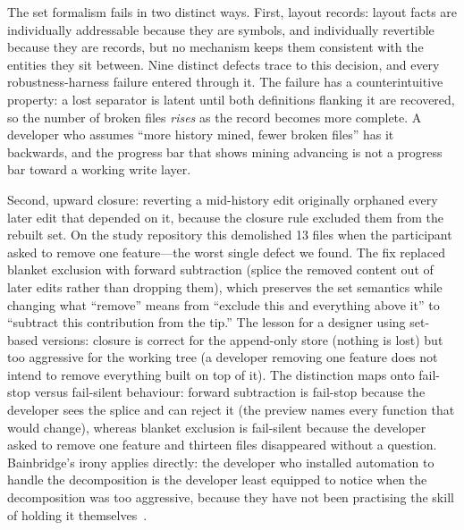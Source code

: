 The set formalism fails in two distinct ways. First, layout records: layout
facts are individually addressable because they are symbols, and individually
revertible because they are records, but no mechanism keeps them consistent with
the entities they sit between. Nine distinct defects trace to this decision, and
every robustness-harness failure entered through it. The failure has a
counterintuitive property: a lost separator is latent until both definitions
flanking it are recovered, so the number of broken files \emph{rises} as the
record becomes more complete. A developer who assumes ``more history mined,
fewer broken files'' has it backwards, and the progress bar that shows mining
advancing is not a progress bar toward a working write layer.

Second, upward closure: reverting a mid-history edit originally orphaned every
later edit that depended on
it, because the closure rule excluded them from the rebuilt set. On the study
repository this demolished 13 files when the participant asked to remove one
feature---the worst single defect we found. The fix replaced blanket exclusion
with forward subtraction (splice the removed content out of later edits rather
than dropping them), which preserves the set semantics while changing what
``remove'' means from ``exclude this and everything above it'' to ``subtract this
contribution from the tip.'' The lesson for a designer using set-based versions:
closure is correct for the append-only store (nothing is lost) but too aggressive
for the working tree (a developer removing one feature does not intend to remove
everything built on top of it). The distinction maps onto fail-stop versus
fail-silent behaviour: forward subtraction is fail-stop because the developer
sees the splice and can reject it (the preview names every function that would
change), whereas blanket exclusion is fail-silent because the developer asked
to remove one feature and thirteen files disappeared without a question.
Bainbridge's irony applies directly: the developer who installed automation to
handle the decomposition is the developer least equipped to notice when the
decomposition was too aggressive, because they have not been practising the
skill of holding it themselves~\cite{bainbridge1983}.

